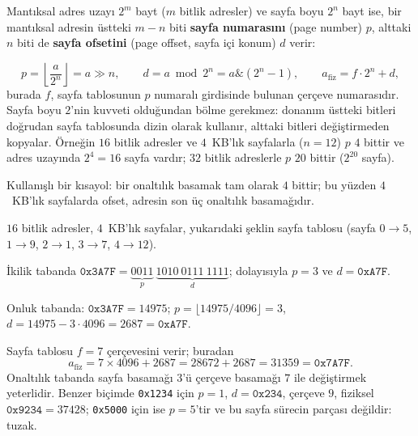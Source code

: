 \documentclass[11pt,a4paper]{article}
\newcommand{\term}[1]{\textbf{\color{mintdeep}#1}}
\begin{document}
Mantıksal adres uzayı $2^{m}$ bayt ($m$ bitlik adresler) ve sayfa boyu $2^{n}$ bayt ise, bir mantıksal adresin üstteki $m-n$ biti \term{sayfa numarasını} (page number) $p$, alttaki $n$ biti de \term{sayfa ofsetini} (page offset, sayfa içi konum) $d$ verir:
\begin{center}
\end{center}
\[
p = \left\lfloor \frac{a}{2^{n}} \right\rfloor = a \gg n, \qquad
d = a \bmod 2^{n} = a \mathbin{\&} (2^{n}-1), \qquad
a_{\text{fiz}} = f \cdot 2^{n} + d,
\]
burada $f$, sayfa tablosunun $p$ numaralı girdisinde bulunan çerçeve numarasıdır. Sayfa boyu $2$'nin kuvveti olduğundan bölme gerekmez: donanım üstteki bitleri doğrudan sayfa tablosunda dizin olarak kullanır, alttaki bitleri değiştirmeden kopyalar. Örneğin $16$ bitlik adresler ve $4$~KB'lık sayfalarla ($n=12$) $p$ $4$ bittir ve adres uzayında $2^{4}=16$ sayfa vardır; $32$ bitlik adreslerle $p$ $20$ bittir ($2^{20}$ sayfa).

Kullanışlı bir kısayol: bir onaltılık basamak tam olarak $4$ bittir; bu yüzden $4$~KB'lık sayfalarda ofset, adresin son üç onaltılık basamağıdır.

\begin{example}
$16$ bitlik adresler, $4$~KB'lık sayfalar, yukarıdaki şeklin sayfa tablosu (sayfa $0\to5$, $1\to9$, $2\to1$, $3\to7$, $4\to12$).

İkilik tabanda $\texttt{0x3A7F} = \underbrace{0011}_{p}\ \underbrace{1010\ 0111\ 1111}_{d}$; dolayısıyla $p = 3$ ve $d = \texttt{0xA7F}$.

Onluk tabanda: $\texttt{0x3A7F} = 14975$; $p = \lfloor 14975/4096 \rfloor = 3$, $d = 14975 - 3\cdot4096 = 2687 = \texttt{0xA7F}$.

Sayfa tablosu $f = 7$ çerçevesini verir; buradan
\[
a_{\text{fiz}} = 7 \times 4096 + 2687 = 28672 + 2687 = 31359 = \texttt{0x7A7F}.
\]
Onaltılık tabanda sayfa basamağı $3$'ü çerçeve basamağı $7$ ile değiştirmek yeterlidir. Benzer biçimde \texttt{0x1234} için $p=1$, $d=\texttt{0x234}$, çerçeve $9$, fiziksel $\texttt{0x9234} = 37428$; \texttt{0x5000} için ise $p = 5$'tir ve bu sayfa sürecin parçası değildir: tuzak.
\end{example}
\end{document}
